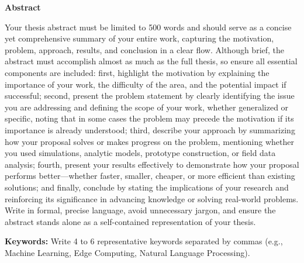 %

\clearpage
{}
{}

\begin{center}
  {\fontsize{14pt}{18pt}\selectfont\bfseries Abstract\par}
  \vspace{12pt}
\end{center}

Your thesis abstract must be limited to 500 words and should serve as a concise yet comprehensive summary of your entire work, capturing the motivation, problem, approach, results, and conclusion in a clear flow. Although brief, the abstract must accomplish almost as much as the full thesis, so ensure all essential components are included: first, highlight the motivation by explaining the importance of your work, the difficulty of the area, and the potential impact if successful; second, present the problem statement by clearly identifying the issue you are addressing and defining the scope of your work, whether generalized or specific, noting that in some cases the problem may precede the motivation if its importance is already understood; third, describe your approach by summarizing how your proposal solves or makes progress on the problem, mentioning whether you used simulations, analytic models, prototype construction, or field data analysis; fourth, present your results effectively to demonstrate how your proposal performs better---whether faster, smaller, cheaper, or more efficient than existing solutions; and finally, conclude by stating the implications of your research and reinforcing its significance in advancing knowledge or solving real-world problems. Write in formal, precise language, avoid unnecessary jargon, and ensure the abstract stands alone as a self-contained representation of your thesis.

\vspace{14pt}
\noindent
\textbf{Keywords:} Write 4 to 6 representative keywords separated by commas (e.g., Machine Learning, Edge Computing, Natural Language Processing).

